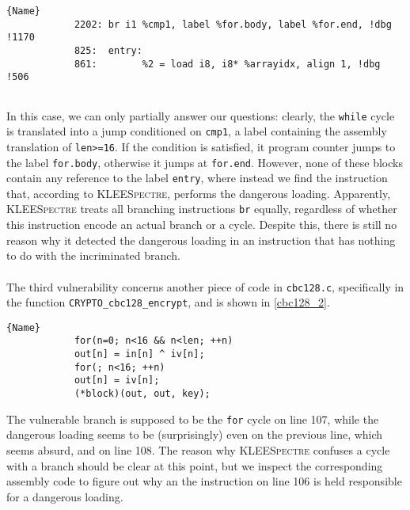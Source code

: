 \documentclass[target=mst,aauheader=aics]{thud}
\theoremstyle{definition}
\begin{document}
	\lstset{
		numbers=none
	}
	\begin{minipage}{.9\textwidth}
		\begin{lstlisting}[caption=\texttt{assembly.ll} (for AES-CBC), label=asm2]{Name}
			2202: br i1 %cmp1, label %for.body, label %for.end, !dbg !1170
			825:  entry:  
			861:  		%2 = load i8, i8* %arrayidx, align 1, !dbg !506
			
		\end{lstlisting}
	\end{minipage}
	\vspace{3mm}
	
	In this case, we can only partially answer our questions: clearly, the \texttt{while} cycle is translated into a jump conditioned on \texttt{cmp1}, a label containing the assembly translation of \texttt{len>=16}. If the condition is satisfied, it program counter jumps to the label \texttt{for.body}, otherwise it jumps at \texttt{for.end}. However, none of these blocks contain any reference to the label \texttt{entry}, where instead we find the instruction that, according to \textsc{KLEESpectre}, performs the dangerous loading. Apparently, \textsc{KLEESpectre} treats all branching instructions \texttt{br} equally, regardless of whether this instruction encode an actual branch or a cycle. Despite this, there is still no reason why it detected the dangerous loading in an instruction that has nothing to do with the incriminated branch. 
	\paragraph{}The third vulnerability concerns another piece of code in \texttt{cbc128.c}, specifically in the function \texttt{CRYPTO\_cbc128\_encrypt}, and is shown in \ref{cbc128_2}.
	
	\begin{minipage}{.45\textwidth}
		\begin{lstlisting}[caption=\texttt{cbc128.c}, firstnumber=105, label=cbc128_2]{Name}
			for(n=0; n<16 && n<len; ++n)
			out[n] = in[n] ^ iv[n];
			for(; n<16; ++n)
			out[n] = iv[n];
			(*block)(out, out, key);
		\end{lstlisting}
	\end{minipage}
	\vspace{3mm}
	
	The vulnerable branch is supposed to be the \texttt{for} cycle on line 107, while the dangerous loading seems to be (surprisingly) even on the previous line, which seems absurd, and on line 108. The reason why \textsc{KLEESpectre} confuses a cycle with a branch should be clear at this point, but we inspect the corresponding assembly code to figure out why an the instruction on line 106 is held responsible for a dangerous loading.
	
\end{document}
